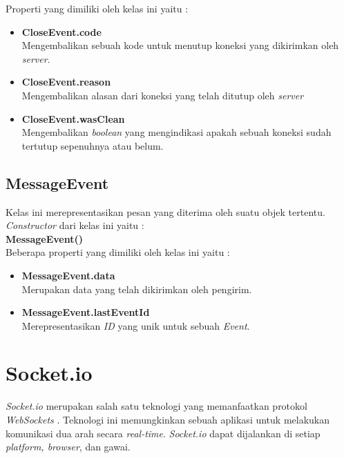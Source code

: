 Properti yang dimiliki oleh kelas ini yaitu : 

\begin{itemize}
	\item \textbf{CloseEvent.code} \\ Mengembalikan sebuah kode untuk menutup koneksi yang dikirimkan oleh \textit{server}.
	\item \textbf{CloseEvent.reason} \\ Mengembalikan alasan dari koneksi yang telah ditutup oleh \textit{server}
	\item \textbf{CloseEvent.wasClean} \\ Mengembalikan \textit{boolean} yang mengindikasi apakah sebuah koneksi sudah tertutup sepenuhnya atau belum.
\end{itemize}

\subsection{MessageEvent}
Kelas ini merepresentasikan pesan yang diterima oleh suatu objek tertentu. \textit{Constructor} dari kelas ini yaitu : \\

\textbf{MessageEvent()} \\

Beberapa properti yang dimiliki oleh kelas ini yaitu : 

\begin{itemize}
	\item \textbf{MessageEvent.data} \\ Merupakan data yang telah dikirimkan oleh pengirim.
	\item \textbf{MessageEvent.lastEventId} \\ Merepresentasikan \textit{ID} yang unik untuk sebuah \textit{Event}.
\end{itemize}



\section{Socket.io}
\label{sec:Socket.io}

\textit{Socket.io} merupakan salah satu teknologi yang memanfaatkan protokol \textit{WebSockets} \cite{socketio}. Teknologi ini memungkinkan sebuah aplikasi untuk melakukan komunikasi dua arah secara \textit{real-time}. \textit{Socket.io} dapat dijalankan di setiap \textit{platform, browser}, dan gawai.

